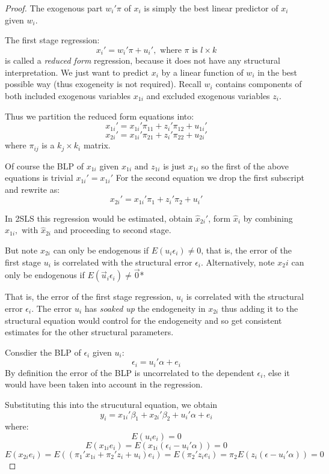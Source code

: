 \documentclass[DIV=14,titlepage=false]{scrreprt}
\begin{document}
\begin{proof}
The exogenous part \(w_i'\pi\) of \(x_i\) is simply the best linear predictor of \(x_i\) given \(w_i\).

The first stage regression:
\[x_i'=w_i'\pi+u_i', \text{ where }\pi \text{ is } l\times k\]
is called a \textit{reduced form} regression, because it does not have any structural interpretation. We just want to predict \(x_i\) by a linear function of \(w_i\) in the best possible way (thus exogeneity is not required).
Recall \(w_i\) contains components of both included exogenous variables \(x_{1i}\) and excluded exogenous variables \(z_i\).

Thus we partition the reduced form equations into:
\[x_{1i}'=x_{1i}'\pi_{11}+z_i'\pi_{12}+u_{1i}'\]
\[x_{2i}'=x_{1i}'\pi_{21}+z_i'\pi_{22}+u_{2i}'\]
where \(\pi_{ij}\) is a \(k_j\times k_i\) matrix.

Of course the BLP of \(x_{1i}\) given \(x_{1i}\text{ and }z_{1i}\) is just \(x_{1i}\) so the first of the above equations is trivial \(x_{1i}'=x_{1i}'\)
For the second equation we drop the first subscript and rewrite as:
\[x_{2i}'=x_{1i}'\pi_{1}+z_i'\pi_{2}+u_{i}'\]

In 2SLS this regression would be estimated, obtain \(\hat x_{2i}'\), form \(\hat x_i\) by combining \(x_{1i},\text{ with }\hat x_{2i}\) and proceeding to second stage.

But note \(x_{2i}\) can only be endogenous if \(E(u_i\epsilon_i)\neq0\), that is, the error of the first stage \(u_i\) is correlated with the structural error \(\epsilon_i\).
Alternatively, note \(x_2i\) can only be endogenous if \(E(\vec u_i \epsilon_i)\neq\vec0\)*

That is, the error of the first stage regression, \(u_i\) is correlated with the structural error \(\epsilon_i\). 
The error \(u_i\) has \textit{soaked up} the endogeneity in \(x_{2i}\) thus adding it to the structural equation would control for the endogeneity and so get consistent estimates for the other structural parameters.

Consdier the BLP of \(\epsilon_i\) given \(u_i\):
\[\epsilon_i=u_i'\alpha+e_i\]
By definition the error of the BLP is uncorrelated to the dependent \(\epsilon_i\), else it would have been taken into account in the regression.

Substituting this into the strucutural equation, we obtain\[y_i=x_{1i}'\beta_1+x_{2i}'\beta_2+u_i'\alpha+e_i\]
where:
\[E(u_ie_i)=0\]
\[E(x_{1i}e_i)=E(x_{1i}(\epsilon_i-u_i'\alpha))=0\]
\[E(x_{2i}e_i)=E((\pi_1'x_{1i}+\pi_2'z_i+u_i)e_i)=E(\pi_2'z_ie_i)=\pi_2E(z_i(\epsilon-u_i'\alpha))=0\]


\end{proof}
\end{document}

